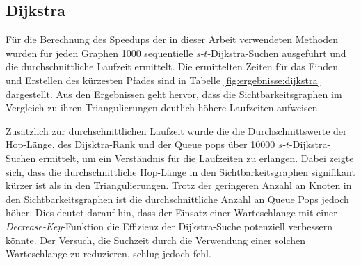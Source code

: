 \subsection{Dijkstra}

Für die Berechnung des Speedups der in dieser Arbeit verwendeten Methoden wurden für jeden Graphen \num{1000} sequentielle $s$-$t$-Dijkstra-Suchen ausgeführt und die durchschnittliche Laufzeit ermittelt.
Die ermittelten Zeiten für das Finden und Erstellen des kürzesten Pfades sind in Tabelle \ref{fig:ergebnisse:dijkstra} dargestellt.
Aus den Ergebnissen geht hervor, dass die Sichtbarkeitsgraphen im Vergleich zu ihren Triangulierungen deutlich höhere Laufzeiten aufweisen.

Zusätzlich zur durchschnittlichen Laufzeit wurde die die Durchschnittswerte der Hop-Länge, des Dijsktra-Rank und der Queue pops über \num{10000} $s$-$t$-Dijkstra-Suchen ermittelt, um ein Verständnis für die Laufzeiten zu erlangen.
Dabei zeigte sich, dass die durchschnittliche Hop-Länge in den Sichtbarkeitsgraphen signifikant kürzer ist als in den Triangulierungen.
Trotz der geringeren Anzahl an Knoten in den Sichtbarkeitsgraphen ist die durchschnittliche Anzahl an Queue Pops jedoch höher.
Dies deutet darauf hin, dass der Einsatz einer Warteschlange mit einer \emph{Decrease-Key}-Funktion die Effizienz der Dijkstra-Suche potenziell verbessern könnte.
Der Versuch, die Suchzeit durch die Verwendung einer solchen Warteschlange zu reduzieren, schlug jedoch fehl.

